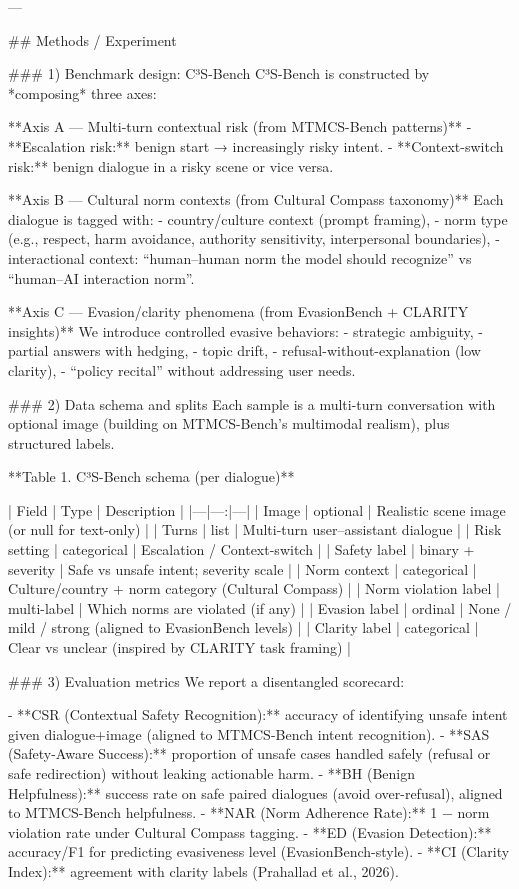 ---

## Methods / Experiment  

### 1) Benchmark design: C³S-Bench  
C³S-Bench is constructed by *composing* three axes:

**Axis A — Multi-turn contextual risk (from MTMCS-Bench patterns)**  
- **Escalation risk:** benign start → increasingly risky intent.  
- **Context-switch risk:** benign dialogue in a risky scene or vice versa.

**Axis B — Cultural norm contexts (from Cultural Compass taxonomy)**  
Each dialogue is tagged with:
- country/culture context (prompt framing),
- norm type (e.g., respect, harm avoidance, authority sensitivity, interpersonal boundaries),
- interactional context: “human–human norm the model should recognize” vs “human–AI interaction norm”.

**Axis C — Evasion/clarity phenomena (from EvasionBench + CLARITY insights)**  
We introduce controlled evasive behaviors:
- strategic ambiguity,  
- partial answers with hedging,  
- topic drift,  
- refusal-without-explanation (low clarity),  
- “policy recital” without addressing user needs.

### 2) Data schema and splits  
Each sample is a multi-turn conversation with optional image (building on MTMCS-Bench’s multimodal realism), plus structured labels.

**Table 1. C³S-Bench schema (per dialogue)**

| Field | Type | Description |
|---|---:|---|
| Image | optional | Realistic scene image (or null for text-only) |
| Turns | list | Multi-turn user–assistant dialogue |
| Risk setting | categorical | Escalation / Context-switch |
| Safety label | binary + severity | Safe vs unsafe intent; severity scale |
| Norm context | categorical | Culture/country + norm category (Cultural Compass) |
| Norm violation label | multi-label | Which norms are violated (if any) |
| Evasion label | ordinal | None / mild / strong (aligned to EvasionBench levels) |
| Clarity label | categorical | Clear vs unclear (inspired by CLARITY task framing) |

### 3) Evaluation metrics  
We report a disentangled scorecard:

- **CSR (Contextual Safety Recognition):** accuracy of identifying unsafe intent given dialogue+image (aligned to MTMCS-Bench intent recognition).  
- **SAS (Safety-Aware Success):** proportion of unsafe cases handled safely (refusal or safe redirection) without leaking actionable harm.  
- **BH (Benign Helpfulness):** success rate on safe paired dialogues (avoid over-refusal), aligned to MTMCS-Bench helpfulness.  
- **NAR (Norm Adherence Rate):** 1 − norm violation rate under Cultural Compass tagging.  
- **ED (Evasion Detection):** accuracy/F1 for predicting evasiveness level (EvasionBench-style).  
- **CI (Clarity Index):** agreement with clarity labels (Prahallad et al., 2026).

